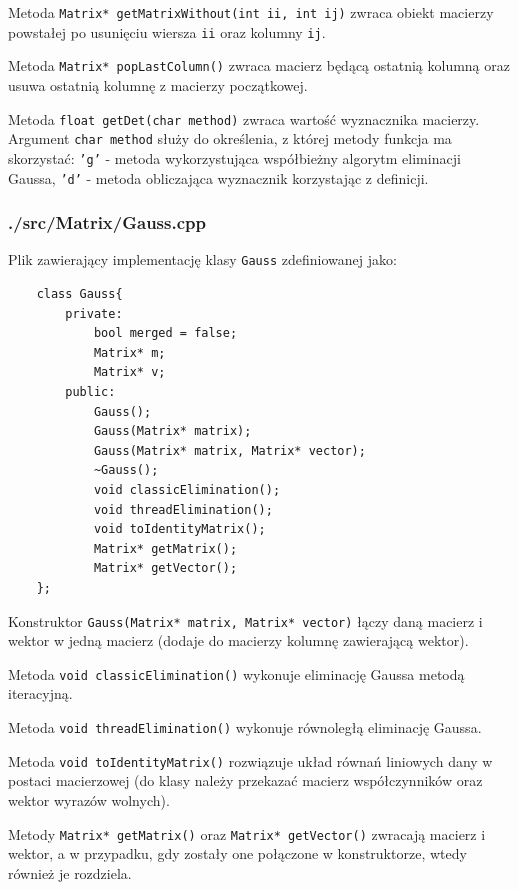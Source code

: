 \documentclass{article}
\begin{document}
Metoda \texttt{Matrix* getMatrixWithout(int ii, int ij)} zwraca obiekt macierzy powstałej po usunięciu wiersza \texttt{ii} oraz kolumny \texttt{ij}.

Metoda \texttt{Matrix* popLastColumn()} zwraca macierz będącą ostatnią kolumną oraz usuwa ostatnią kolumnę z macierzy początkowej.

Metoda \texttt{float getDet(char method)} zwraca wartość wyznacznika macierzy. Argument \texttt{char method} służy do określenia, z której metody funkcja ma skorzystać: \texttt{'g'} - metoda wykorzystująca współbieżny algorytm eliminacji Gaussa, \texttt{'d'} - metoda obliczająca wyznacznik korzystając z definicji.

\subsubsection{./src/Matrix/Gauss.cpp}

Plik zawierający implementację klasy \texttt{Gauss} zdefiniowanej jako:

\begin{verbatim}
    class Gauss{
        private:
            bool merged = false;
            Matrix* m;
            Matrix* v;
        public:
            Gauss();
            Gauss(Matrix* matrix);
            Gauss(Matrix* matrix, Matrix* vector);
            ~Gauss();
            void classicElimination();
            void threadElimination();
            void toIdentityMatrix();
            Matrix* getMatrix();
            Matrix* getVector();
    };
\end{verbatim}

Konstruktor \texttt{Gauss(Matrix* matrix, Matrix* vector)} łączy daną macierz i wektor w jedną macierz (dodaje do macierzy kolumnę zawierającą wektor).

Metoda \texttt{void classicElimination()} wykonuje eliminację Gaussa metodą iteracyjną.

Metoda \texttt{void threadElimination()} wykonuje równoległą eliminację Gaussa.

Metoda \texttt{void toIdentityMatrix()} rozwiązuje układ równań liniowych dany w postaci macierzowej (do klasy należy przekazać macierz współczynników oraz wektor wyrazów wolnych).

Metody \texttt{Matrix* getMatrix()} oraz \texttt{Matrix* getVector()} zwracają macierz i wektor, a w przypadku, gdy zostały one połączone w konstruktorze, wtedy również je rozdziela.
\end{document}
